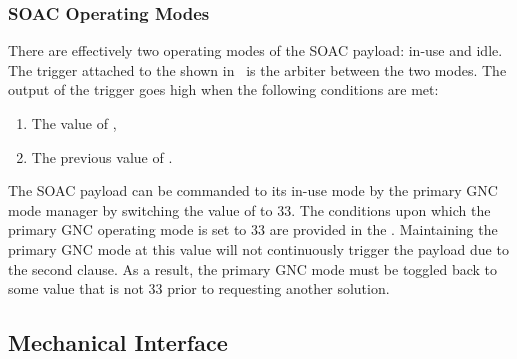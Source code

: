 \documentclass[10pt]{article}
\begin{document}
\subsubsection{SOAC Operating Modes}\label{sec3:op_modes}
There are effectively two operating modes of the SOAC payload: in-use and idle. The trigger attached to the  shown in~ is the arbiter between the two modes. The output of the trigger goes high when the following conditions are met:
\begin{enumerate}
\item The value of ,
\item The previous value of .
\end{enumerate}
The SOAC payload can be commanded to its in-use mode by the primary GNC mode manager by switching the value of  to $33$. The conditions upon which the primary GNC operating mode is set to $33$ are provided in the . Maintaining the primary GNC mode at this value will not continuously trigger the payload due to the second clause. As a result, the primary GNC mode must be toggled back to some value that is not $33$ prior to requesting another solution.  



\subsection{Mechanical Interface}\label{sec2:mech_interface}
\end{document}
